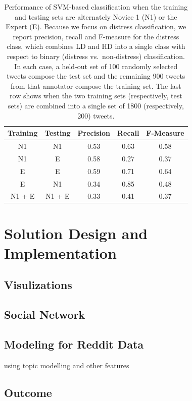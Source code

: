 \begin{table}[h]
\small \centering
\begin{tabular}{|c|c|c|c|c|}
\hline
Training         & Testing         & Precision & Recall & F-Measure \\ \hline
N1          & N1          & 0.53      & 0.63   & 0.58      \\ \hline
N1          & E & 0.58       & 0.27   & 0.37       \\ \hline
E           & E     & 0.59      & 0.71   & 0.64      \\ \hline
E            & N1          & 0.34      & 0.85   & 0.48      \\ \hline
N1 + E & N1 + E & 0.33      & 0.41   &  0.37         \\ \hline
\end{tabular}
\caption{Performance of SVM-based classification when the training and testing sets are alternately Novice 1 (N1) or the Expert (E). Because we focus on distress classification, we report precision, recall and F-measure for the distress class, which combines LD and HD into a single class with respect to  binary (distress vs.\ non-distress) classification. In each case, a held-out set of 100 randomly selected tweets compose the test set and the remaining 900 tweets from that annotator compose the training set. The last row shows when the two training sets (respectively, test sets) are combined into a single set of 1800 (respectively, 200) tweets. }
\label{tab:svm}
\end{table}



\section{Solution Design and Implementation}

\subsection{Visulizations}
\subsection{Social Network} 
\subsection{Modeling for Reddit Data} 
using topic modelling and other features 
\subsection{Outcome}
